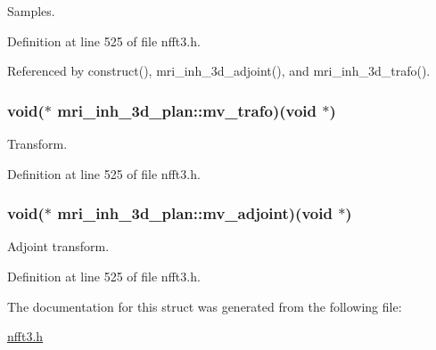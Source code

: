 Samples. 



Definition at line 525 of file nfft3.\-h.



Referenced by construct(), mri\-\_\-inh\-\_\-3d\-\_\-adjoint(), and mri\-\_\-inh\-\_\-3d\-\_\-trafo().

\hypertarget{structmri__inh__3d__plan_a780818802d5bfdc4d4174a3637254fd5}{
\subsubsection[{mv\-\_\-trafo}]{\setlength{\rightskip}{0pt plus 5cm}void($\ast$ mri\-\_\-inh\-\_\-3d\-\_\-plan\-::mv\-\_\-trafo)(void $\ast$)}}\label{structmri__inh__3d__plan_a780818802d5bfdc4d4174a3637254fd5}


Transform. 



Definition at line 525 of file nfft3.\-h.

\hypertarget{structmri__inh__3d__plan_afa2e143e704b701e9a0ee1d795f46b5b}{
\subsubsection[{mv\-\_\-adjoint}]{\setlength{\rightskip}{0pt plus 5cm}void($\ast$ mri\-\_\-inh\-\_\-3d\-\_\-plan\-::mv\-\_\-adjoint)(void $\ast$)}}\label{structmri__inh__3d__plan_afa2e143e704b701e9a0ee1d795f46b5b}


Adjoint transform. 



Definition at line 525 of file nfft3.\-h.



The documentation for this struct was generated from the following file\-:\begin{DoxyCompactItemize}
\item 
\hyperlink{nfft3_8h}{nfft3.\-h}\end{DoxyCompactItemize}
